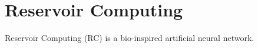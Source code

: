 \chapter{Reservoir Computing}

Reservoir Computing (RC) is a bio-inspired artificial neural network.